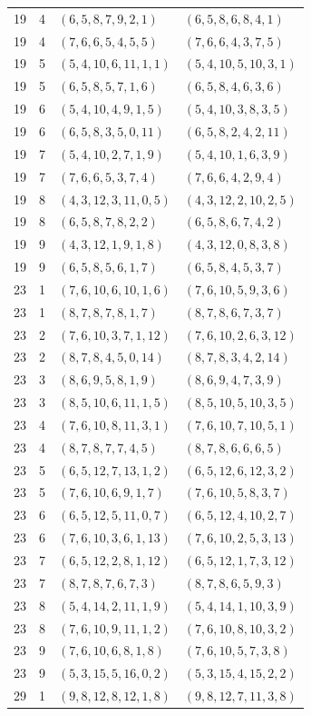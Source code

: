 \documentclass[11pt,a4paper]{article}
\theoremstyle{definition}
\numberwithin{equation}{section}
\begin{document}
\begin{longtable}{rrll}
19&4&$(6,5,8,7,9,2,1)$&$(6,5,8,6,8,4,1)$\\
19&4&$(7,6,6,5,4,5,5)$&$(7,6,6,4,3,7,5)$\\
19&5&$(5,4,10,6,11,1,1)$&$(5,4,10,5,10,3,1)$\\
19&5&$(6,5,8,5,7,1,6)$&$(6,5,8,4,6,3,6)$\\
19&6&$(5,4,10,4,9,1,5)$&$(5,4,10,3,8,3,5)$\\
19&6&$(6,5,8,3,5,0,11)$&$(6,5,8,2,4,2,11)$\\
19&7&$(5,4,10,2,7,1,9)$&$(5,4,10,1,6,3,9)$\\
19&7&$(7,6,6,5,3,7,4)$&$(7,6,6,4,2,9,4)$\\
19&8&$(4,3,12,3,11,0,5)$&$(4,3,12,2,10,2,5)$\\
19&8&$(6,5,8,7,8,2,2)$&$(6,5,8,6,7,4,2)$\\
19&9&$(4,3,12,1,9,1,8)$&$(4,3,12,0,8,3,8)$\\
19&9&$(6,5,8,5,6,1,7)$&$(6,5,8,4,5,3,7)$\\
23&1&$(7,6,10,6,10,1,6)$&$(7,6,10,5,9,3,6)$\\
23&1&$(8,7,8,7,8,1,7)$&$(8,7,8,6,7,3,7)$\\
23&2&$(7,6,10,3,7,1,12)$&$(7,6,10,2,6,3,12)$\\
23&2&$(8,7,8,4,5,0,14)$&$(8,7,8,3,4,2,14)$\\
23&3&$(8,6,9,5,8,1,9)$&$(8,6,9,4,7,3,9)$\\
23&3&$(8,5,10,6,11,1,5)$&$(8,5,10,5,10,3,5)$\\
23&4&$(7,6,10,8,11,3,1)$&$(7,6,10,7,10,5,1)$\\
23&4&$(8,7,8,7,7,4,5)$&$(8,7,8,6,6,6,5)$\\
23&5&$(6,5,12,7,13,1,2)$&$(6,5,12,6,12,3,2)$\\
23&5&$(7,6,10,6,9,1,7)$&$(7,6,10,5,8,3,7)$\\
23&6&$(6,5,12,5,11,0,7)$&$(6,5,12,4,10,2,7)$\\
23&6&$(7,6,10,3,6,1,13)$&$(7,6,10,2,5,3,13)$\\
23&7&$(6,5,12,2,8,1,12)$&$(6,5,12,1,7,3,12)$\\
23&7&$(8,7,8,7,6,7,3)$&$(8,7,8,6,5,9,3)$\\
23&8&$(5,4,14,2,11,1,9)$&$(5,4,14,1,10,3,9)$\\
23&8&$(7,6,10,9,11,1,2)$&$(7,6,10,8,10,3,2)$\\
23&9&$(7,6,10,6,8,1,8)$&$(7,6,10,5,7,3,8)$\\
23&9&$(5,3,15,5,16,0,2)$&$(5,3,15,4,15,2,2)$\\
29&1&$(9,8,12,8,12,1,8)$&$(9,8,12,7,11,3,8)$\\

\end{longtable}
\end{document}
